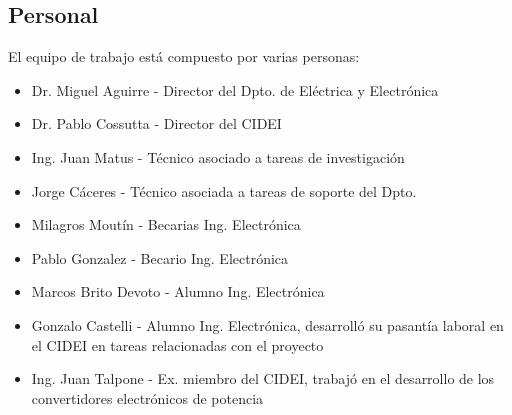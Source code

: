 \documentclass[a4]{article}
\begin{document}
\subsection{Personal}
El equipo de trabajo está compuesto por varias personas:
\begin{itemize}
    \item Dr. Miguel Aguirre - Director del Dpto. de Eléctrica y Electrónica
    \item Dr. Pablo Cossutta - Director del CIDEI
    \item Ing. Juan Matus - Técnico asociado a tareas de investigación
    \item Jorge Cáceres - Técnico asociada a tareas de soporte del Dpto.
    \item Milagros Moutín - Becarias Ing. Electrónica
    \item Pablo Gonzalez - Becario Ing. Electrónica
    \item Marcos Brito Devoto - Alumno Ing. Electrónica
    \item Gonzalo Castelli - Alumno Ing. Electrónica, desarrolló su pasantía laboral en el CIDEI en tareas relacionadas con el proyecto
    \item Ing. Juan Talpone - Ex. miembro del CIDEI, trabajó en el desarrollo de los convertidores electrónicos de potencia
\end{itemize}
\end{document}
